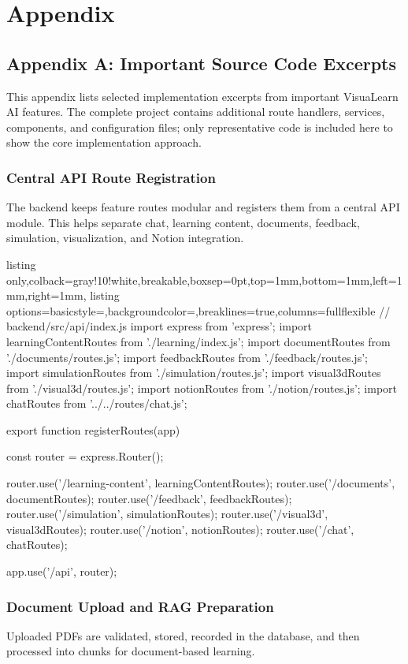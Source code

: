 \chapter{Appendix}

\section{Appendix A: Important Source Code Excerpts}
This appendix lists selected implementation excerpts from important VisuaLearn AI features. The complete project contains additional route handlers, services, components, and configuration files; only representative code is included here to show the core implementation approach.

\subsection{Central API Route Registration}
The backend keeps feature routes modular and registers them from a central API module. This helps separate chat, learning content, documents, feedback, simulation, visualization, and Notion integration.

\begin{tcblisting}{listing only,colback=gray!10!white,breakable,boxsep=0pt,top=1mm,bottom=1mm,left=1mm,right=1mm,
listing options={basicstyle=\footnotesize\ttfamily,backgroundcolor=\color{gray!20},breaklines=true,columns=fullflexible}}
// backend/src/api/index.js
import express from 'express';
import learningContentRoutes from './learning/index.js';
import documentRoutes from './documents/routes.js';
import feedbackRoutes from './feedback/routes.js';
import simulationRoutes from './simulation/routes.js';
import visual3dRoutes from './visual3d/routes.js';
import notionRoutes from './notion/routes.js';
import chatRoutes from '../../routes/chat.js';

export function registerRoutes(app) {
  const router = express.Router();

  router.use('/learning-content', learningContentRoutes);
  router.use('/documents', documentRoutes);
  router.use('/feedback', feedbackRoutes);
  router.use('/simulation', simulationRoutes);
  router.use('/visual3d', visual3dRoutes);
  router.use('/notion', notionRoutes);
  router.use('/chat', chatRoutes);

  app.use('/api', router);
}
\end{tcblisting}

\subsection{Document Upload and RAG Preparation}
Uploaded PDFs are validated, stored, recorded in the database, and then processed into chunks for document-based learning.

